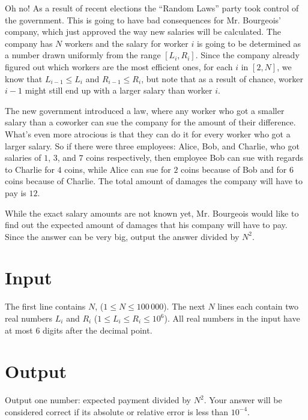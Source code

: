 
Oh no! As a result of recent elections the ``Random Laws'' party took control of the government. This is going to have bad consequences for Mr. Bourgeois' company,
which just approved the way new salaries will be calculated. The company has $N$ workers and the salary for worker $i$ is going to
be determined as a number drawn uniformly from the range $[L_i, R_i]$. Since the company already figured out which workers are
the most efficient ones, for each $i$ in $[2, N]$, we know that $L_{i-1} \leq L_i$ and $R_{i-1} \leq R_i$, but note that as a result of chance,
worker $i-1$ might still end up with a larger salary than worker $i$.

The new government introduced a law, where any worker who got a smaller salary than a coworker can sue
the company for the amount of their difference. What's even more atrocious is that they can do it for every worker who got a larger salary.
So if there were three employees: Alice, Bob, and Charlie, who got salaries of $1$, $3$, and $7$ coins respectively, then employee Bob can sue with regards to Charlie for $4$ coins,
while Alice can sue for $2$ coins because of Bob and for $6$ coins because of Charlie. The total amount of damages
the company will have to pay is $12$.

While the exact salary amounts are not known yet, Mr. Bourgeois would like to find out the expected amount of damages that his company
will have to pay. Since the answer can be very big, output the answer divided by $N^2$. 

\section*{Input}
The first line contains $N$, ($1 \leq N \leq 100\,000$). The next $N$ lines each contain two real numbers $L_i$ and $R_i$ ($1 \leq L_i \leq R_i \leq 10^6$). All real numbers in the input have at most $6$ digits after the decimal point.

\section*{Output}
Output one number: expected payment divided by $N^2$. Your answer will be considered correct if its absolute or relative error is less than $10^{-4}$.
